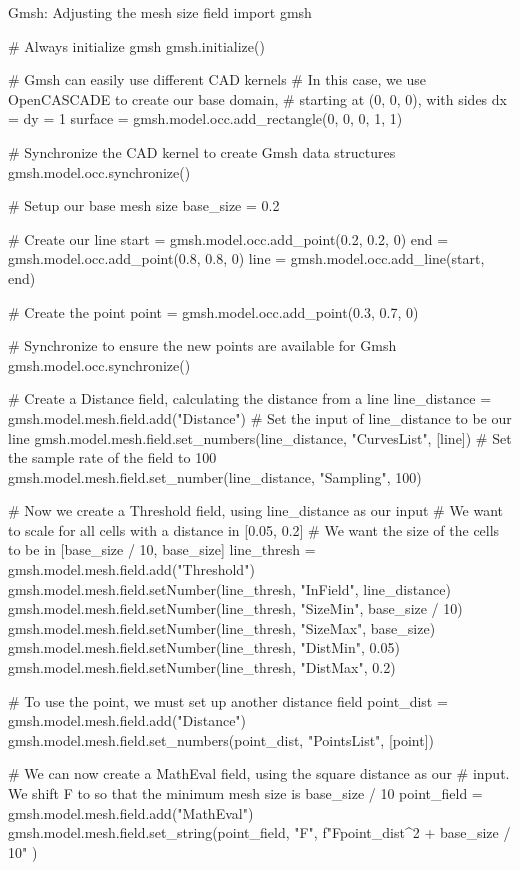 \begin{python}[label=py:Gmshfield, float=htp, breakable]{Gmsh: Adjusting the mesh size field}
import gmsh

# Always initialize gmsh
gmsh.initialize()

# Gmsh can easily use different CAD kernels
# In this case, we use OpenCASCADE to create our base domain,
# starting at (0, 0, 0), with sides dx = dy = 1
surface = gmsh.model.occ.add_rectangle(0, 0, 0, 1, 1)

# Synchronize the CAD kernel to create Gmsh data structures
gmsh.model.occ.synchronize()

# Setup our base mesh size
base_size = 0.2

# Create our line
start = gmsh.model.occ.add_point(0.2, 0.2, 0)
end = gmsh.model.occ.add_point(0.8, 0.8, 0)
line = gmsh.model.occ.add_line(start, end)

# Create the point
point = gmsh.model.occ.add_point(0.3, 0.7, 0)

# Synchronize to ensure the new points are available for Gmsh
gmsh.model.occ.synchronize()

# Create a Distance field, calculating the distance from a line
line_distance = gmsh.model.mesh.field.add("Distance")
# Set the input of line_distance to be our line
gmsh.model.mesh.field.set_numbers(line_distance, "CurvesList", [line])
# Set the sample rate of the field to 100
gmsh.model.mesh.field.set_number(line_distance, "Sampling", 100)

# Now we create a Threshold field, using line_distance as our input
# We want to scale for all cells with a distance in [0.05, 0.2]
# We want the size of the cells to be in [base_size / 10, base_size]
line_thresh = gmsh.model.mesh.field.add("Threshold")
gmsh.model.mesh.field.setNumber(line_thresh, "InField", line_distance)
gmsh.model.mesh.field.setNumber(line_thresh, "SizeMin", base_size / 10)
gmsh.model.mesh.field.setNumber(line_thresh, "SizeMax", base_size)
gmsh.model.mesh.field.setNumber(line_thresh, "DistMin", 0.05)
gmsh.model.mesh.field.setNumber(line_thresh, "DistMax", 0.2)

# To use the point, we must set up another distance field
point_dist = gmsh.model.mesh.field.add("Distance")
gmsh.model.mesh.field.set_numbers(point_dist, "PointsList", [point])

# We can now create a MathEval field, using the square distance as our
# input. We shift F to so that the minimum mesh size is base_size / 10
point_field = gmsh.model.mesh.field.add("MathEval")
gmsh.model.mesh.field.set_string(point_field, "F",
    f"F{point_dist}^2 + {base_size / 10}"
)


\end{python}
